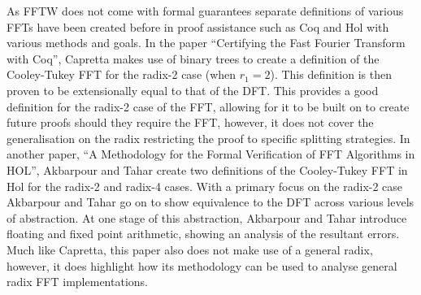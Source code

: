 As FFTW does not come with formal guarantees %
separate definitions of various FFTs have been created before in proof assistance such as Coq\cite{Barras1999} and Hol\cite{Gordon1993} with various methods and goals. In the paper ``Certifying the Fast Fourier Transform with Coq''\cite{Capretta2001}, Capretta makes use of binary trees to create a definition of the Cooley-Tukey FFT\cite{Cooley1965} for the radix-2 case (when $r_1=2$).
This definition is then proven to be extensionally equal to that of the DFT.
This provides a good definition for the radix-2 case of the FFT, allowing for it to be built on to create future proofs should they require the FFT, however, it does not cover the generalisation on the radix restricting the proof to specific splitting strategies.
In another paper, ``A Methodology for the Formal Verification of FFT Algorithms in HOL'',\cite{Akbarpour2004} Akbarpour and Tahar create two definitions of the Cooley-Tukey FFT\cite{Cooley1965} in Hol for the radix-2 and radix-4 cases.
With a primary focus on the radix-2 case Akbarpour and Tahar go on to show equivalence to the DFT across various levels of abstraction.\cite{Akbarpour2004}
At one stage of this abstraction, Akbarpour and Tahar introduce floating and fixed point arithmetic, showing an analysis of the resultant errors.\cite{Akbarpour2004}
Much like Capretta\cite{Capretta2001}, this paper also does not make use of a general radix, however, it does highlight how its methodology can be used to analyse general radix FFT implementations.


